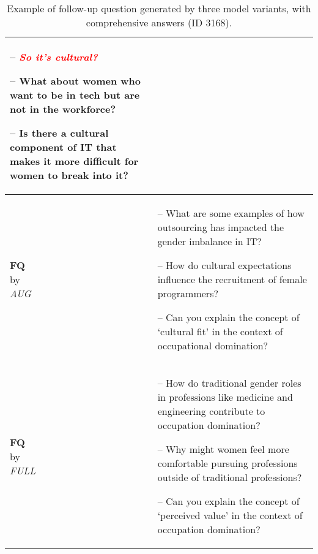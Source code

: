 \begin{table*}[t]
\begin{tabular}{m{} m{}}
            -- \textcolor{red}{\textit{So it’s cultural?}}
            
            -- What about women who want to be in tech but are not in the workforce?
            
            -- Is there a cultural component of IT that makes it more difficult for women to break into it?
 \\
        \midrule
        \shortstack{\textbf{FQ}\\by\\\textit{AUG}} & 
        -- What are some examples of how outsourcing has impacted the gender imbalance in IT?
        
        -- How do cultural expectations influence the recruitment of female programmers?
        
        -- Can you explain the concept of `cultural fit' in the context of occupational domination?
\\
        \midrule
        \shortstack{\textbf{FQ}\\by\\\textit{FULL}} & 
        -- How do traditional gender roles in professions like medicine and engineering contribute to occupation domination?
        
        -- Why might women feel more comfortable pursuing professions outside of traditional professions?
        
        -- Can you explain the concept of `perceived value' in the context of occupation domination?
\\
        \bottomrule
    \end{tabular}
    \caption{Example of follow-up question generated by three model variants, with comprehensive answers (ID 3168).}
    \label{tab:example_question_short}
\end{table*}